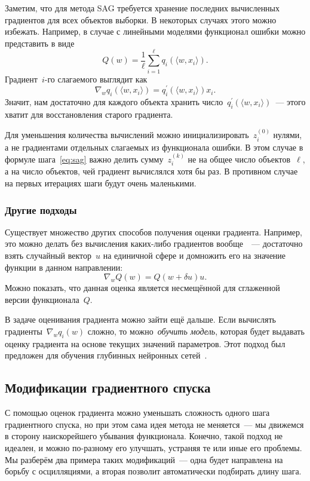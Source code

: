 \documentclass[12pt,fleqn]{article}
\begin{document}
Заметим, что для метода SAG требуется хранение последних вычисленных градиентов для всех объектов выборки.
В некоторых случаях этого можно избежать.
Например, в случае с линейными моделями функционал ошибки можно представить в виде
\[
    Q(w)
    =
    \frac{1}{\ell}
    \sum_{i = 1}^{\ell}
        q_i(\langle w, x_i \rangle).
\]
Градиент~$i$-го слагаемого выглядит как
\[
    \nabla_w q_i(\langle w, x_i \rangle)
    =
    q_i^\prime(\langle w, x_i \rangle) x_i.
\]
Значит, нам достаточно для каждого объекта хранить число~$q_i^\prime(\langle w, x_i \rangle)$~---
этого хватит для восстановления старого градиента.

Для уменьшения количества вычислений можно инициализировать~$z_i^{(0)}$ нулями,
а не градиентами отдельных слагаемых из функционала ошибки.
В этом случае в формуле шага~\eqref{eq:sag} важно делить сумму~$z_i^{(k)}$
не на общее число объектов~$\ell$, а на число объектов, чей градиент вычислялся хотя бы раз.
В противном случае на первых итерациях шаги будут очень маленькими.

\subsubsection{Другие подходы}

Существует множество других способов получения оценки градиента.
Например, это можно делать без вычисления каких-либо градиентов вообще~\cite{flaxman05without}~---
достаточно взять случайный вектор~$u$ на единичной сфере и домножить его
на значение функции в данном направлении:
\[
    \nabla_w Q(w)
    =
    Q(w + \delta u) u.
\]
Можно показать, что данная оценка является несмещённой для сглаженной версии функционала~$Q$.

В задаче оценивания градиента можно зайти ещё дальше.
Если вычислять градиенты~$\nabla_w q_i(w)$ сложно,
то можно~\emph{обучить модель}, которая будет выдавать оценку градиента на основе текущих значений параметров.
Этот подход был предложен для обучения глубинных нейронных сетей~\cite{jaderberg16synthetic}.

\subsection{Модификации градиентного спуска}

С помощью оценок градиента можно уменьшать сложность одного шага градиентного спуска,
но при этом сама идея метода не меняется~--- мы движемся в сторону наискорейшего убывания функционала.
Конечно, такой подход не идеален, и можно по-разному его улучшать, устраняя те или иные его проблемы.
Мы разберём два примера таких модификаций~--- одна будет направлена на борьбу с осцилляциями, а вторая
позволит автоматически подбирать длину шага.
\end{document}
